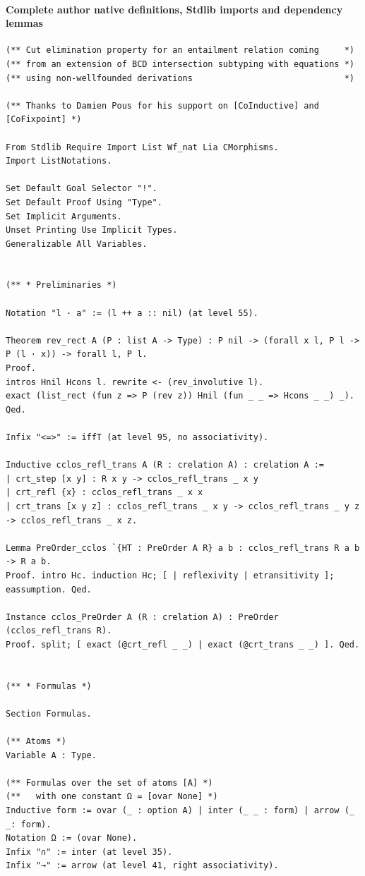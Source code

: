 \documentclass[10pt,a4paper]{article}
\begin{document}
\paragraph{Complete author native definitions, Stdlib imports and dependency lemmas}
\begin{lstlisting}
(** Cut elimination property for an entailment relation coming     *)
(** from an extension of BCD intersection subtyping with equations *)
(** using non-wellfounded derivations                              *)

(** Thanks to Damien Pous for his support on [CoInductive] and [CoFixpoint] *)

From Stdlib Require Import List Wf_nat Lia CMorphisms.
Import ListNotations.

Set Default Goal Selector "!".
Set Default Proof Using "Type".
Set Implicit Arguments.
Unset Printing Use Implicit Types.
Generalizable All Variables.


(** * Preliminaries *)

Notation "l · a" := (l ++ a :: nil) (at level 55).

Theorem rev_rect A (P : list A -> Type) : P nil -> (forall x l, P l -> P (l · x)) -> forall l, P l.
Proof.
intros Hnil Hcons l. rewrite <- (rev_involutive l).
exact (list_rect (fun z => P (rev z)) Hnil (fun _ _ => Hcons _ _) _).
Qed.

Infix "<=>" := iffT (at level 95, no associativity).

Inductive cclos_refl_trans A (R : crelation A) : crelation A :=
| crt_step [x y] : R x y -> cclos_refl_trans _ x y
| crt_refl {x} : cclos_refl_trans _ x x
| crt_trans [x y z] : cclos_refl_trans _ x y -> cclos_refl_trans _ y z -> cclos_refl_trans _ x z.

Lemma PreOrder_cclos `{HT : PreOrder A R} a b : cclos_refl_trans R a b -> R a b.
Proof. intro Hc. induction Hc; [ | reflexivity | etransitivity ]; eassumption. Qed.

Instance cclos_PreOrder A (R : crelation A) : PreOrder (cclos_refl_trans R).
Proof. split; [ exact (@crt_refl _ _) | exact (@crt_trans _ _) ]. Qed.


(** * Formulas *)

Section Formulas.

(** Atoms *)
Variable A : Type.

(** Formulas over the set of atoms [A] *)
(**   with one constant Ω = [ovar None] *)
Inductive form := ovar (_ : option A) | inter (_ _ : form) | arrow (_ _: form).
Notation Ω := (ovar None).
Infix "∩" := inter (at level 35).
Infix "→" := arrow (at level 41, right associativity).


\end{lstlisting}
\end{document}
